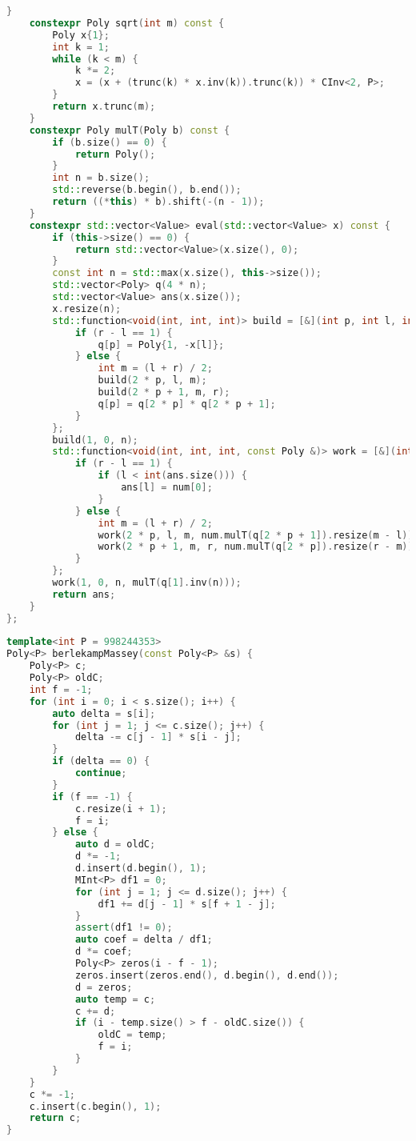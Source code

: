 \begin{lstlisting}[language=c++]
    }
    constexpr Poly sqrt(int m) const {
        Poly x{1};
        int k = 1;
        while (k < m) {
            k *= 2;
            x = (x + (trunc(k) * x.inv(k)).trunc(k)) * CInv<2, P>;
        }
        return x.trunc(m);
    }
    constexpr Poly mulT(Poly b) const {
        if (b.size() == 0) {
            return Poly();
        }
        int n = b.size();
        std::reverse(b.begin(), b.end());
        return ((*this) * b).shift(-(n - 1));
    }
    constexpr std::vector<Value> eval(std::vector<Value> x) const {
        if (this->size() == 0) {
            return std::vector<Value>(x.size(), 0);
        }
        const int n = std::max(x.size(), this->size());
        std::vector<Poly> q(4 * n);
        std::vector<Value> ans(x.size());
        x.resize(n);
        std::function<void(int, int, int)> build = [&](int p, int l, int r) {
            if (r - l == 1) {
                q[p] = Poly{1, -x[l]};
            } else {
                int m = (l + r) / 2;
                build(2 * p, l, m);
                build(2 * p + 1, m, r);
                q[p] = q[2 * p] * q[2 * p + 1];
            }
        };
        build(1, 0, n);
        std::function<void(int, int, int, const Poly &)> work = [&](int p, int l, int r, const Poly &num) {
            if (r - l == 1) {
                if (l < int(ans.size())) {
                    ans[l] = num[0];
                }
            } else {
                int m = (l + r) / 2;
                work(2 * p, l, m, num.mulT(q[2 * p + 1]).resize(m - l));
                work(2 * p + 1, m, r, num.mulT(q[2 * p]).resize(r - m));
            }
        };
        work(1, 0, n, mulT(q[1].inv(n)));
        return ans;
    }
};
 
template<int P = 998244353>
Poly<P> berlekampMassey(const Poly<P> &s) {
    Poly<P> c;
    Poly<P> oldC;
    int f = -1;
    for (int i = 0; i < s.size(); i++) {
        auto delta = s[i];
        for (int j = 1; j <= c.size(); j++) {
            delta -= c[j - 1] * s[i - j];
        }
        if (delta == 0) {
            continue;
        }
        if (f == -1) {
            c.resize(i + 1);
            f = i;
        } else {
            auto d = oldC;
            d *= -1;
            d.insert(d.begin(), 1);
            MInt<P> df1 = 0;
            for (int j = 1; j <= d.size(); j++) {
                df1 += d[j - 1] * s[f + 1 - j];
            }
            assert(df1 != 0);
            auto coef = delta / df1;
            d *= coef;
            Poly<P> zeros(i - f - 1);
            zeros.insert(zeros.end(), d.begin(), d.end());
            d = zeros;
            auto temp = c;
            c += d;
            if (i - temp.size() > f - oldC.size()) {
                oldC = temp;
                f = i;
            }
        }
    }
    c *= -1;
    c.insert(c.begin(), 1);
    return c;
}
 

\end{lstlisting}
